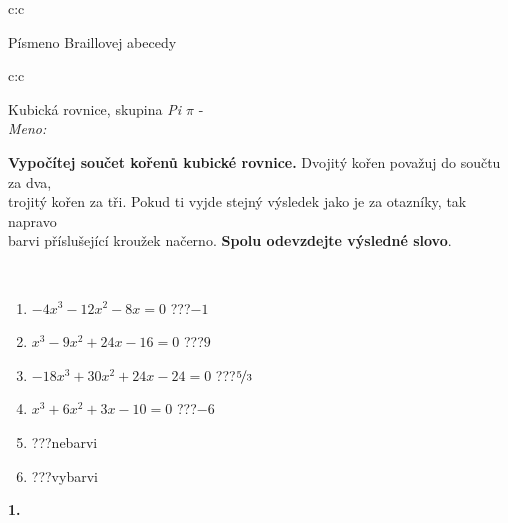 \documentclass[10pt]{report}
\begin{document}
\begin{tabular}{c:c}
\begin{minipage}[c][104.5mm][t]{0.5\linewidth}
\begin{center}
\begin{minipage}{0.20\linewidth}
\begin{center}
{\small Písmeno Braillovej abecedy}
\end{center}
\end{minipage}
\end{center}
\end{minipage}
%
\end{tabular}
\newpage
\thispagestyle{empty}
\begin{tabular}{c:c}
\begin{minipage}[c][104.5mm][t]{0.5\linewidth}
\begin{center}
\vspace{7mm}
{\huge Kubická rovnice, skupina \textit{Pi $\pi$} -}\\[5mm]
\textit{Meno:}\phantom{xxxxxxxxxxxxxxxxxxxxxxxxxxxxxxxxxxxxxxxxxxxxxxxxxxxxxxxxxxxxxxxxx}\\[5mm]
\begin{minipage}{0.95\linewidth}
\textbf{Vypočítej součet kořenů kubické rovnice.} Dvojitý kořen považuj do součtu za dva,\\trojitý kořen za tři. Pokud ti vyjde stejný výsledek jako je za otazníky, tak napravo\\barvi příslušející kroužek načerno. \textbf{Spolu odevzdejte výsledné slovo}.
\end{minipage}
\\[1mm]
\begin{minipage}{0.79\linewidth}
\begin{center}
\begin{varwidth}{\linewidth}
\begin{enumerate}
\Large
\item $-4x^3-12x^2-8x=0$\quad \dotfill\; ???\;\dotfill \quad $-1$
\item $x^3-9x^2+24x-16=0$\quad \dotfill\; ???\;\dotfill \quad $9$
\item $-18x^3+30x^2+24x-24=0$\quad \dotfill\; ???\;\dotfill \quad $\nicefrac{5}{3}$
\item $x^3+6x^2+3x-10=0$\quad \dotfill\; ???\;\dotfill \quad $-6$
\item \quad \dotfill\; ???\;\dotfill \quad nebarvi
\item \quad \dotfill\; ???\;\dotfill \quad vybarvi
\end{enumerate}
\end{varwidth}
\end{center}
\end{minipage}
\begin{minipage}{0.20\linewidth}
\begin{center}
{\Huge\bfseries 1.} \\[2mm]

\end{center}
\end{minipage}
\end{center}
\end{minipage}
\end{tabular}
\end{document}
